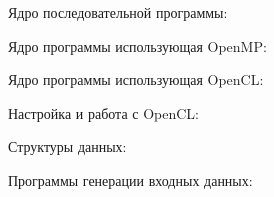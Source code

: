 \documentclass[14pt,final,titlepage,pscyr]{hedwork}
\begin{document}
\newpage

Ядро последовательной программы:


\newpage

Ядро программы использующая OpenMP:


\newpage

Ядро программы использующая OpenCL:


Настройка и работа с OpenCL:


Структуры данных:




Программы генерации входных данных:



\end{document}
